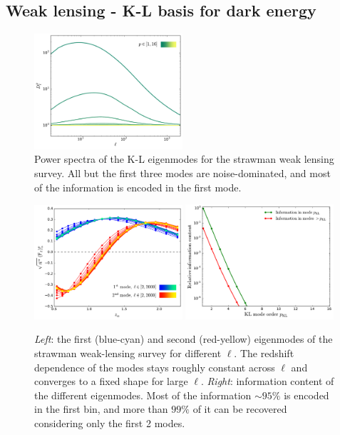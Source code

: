 \documentclass[twocolumn,amsfont,amssymb,amsmath, showpacs,balancelastpage, nofootinbib]{revtex4-1}
\begin{document}
  \subsection{Weak lensing - K-L basis for dark energy}\label{ssec:results.wl}
    \begin{figure}
      \centering
      \includegraphics[width=0.49\textwidth]{Figs/d_p_wl}
      \caption{Power spectra of the K-L eigenmodes for the strawman weak lensing survey. All but the first three modes are noise-dominated, and most of the information is encoded in the first mode.}\label{fig:dp_wl}
    \end{figure}
    \begin{figure}
      \centering
      \includegraphics[width=0.49\textwidth]{Figs/kl_modes_wl}
      \includegraphics[width=0.49\textwidth]{Figs/information_wl}
      \caption{{\sl Left}: the first (blue-cyan) and second (red-yellow) eigenmodes of the strawman weak-lensing survey for different $\ell$. The redshift dependence of the modes stays roughly constant across $\ell$ and converges to a fixed shape for large $\ell$. {\sl Right}: information content of the different eigenmodes. Most of the information $\sim95\%$ is encoded in the first bin, and more than $99\%$ of it can be recovered considering only the first 2 modes.}\label{fig:kl_wl}
    \end{figure}
\end{document}
